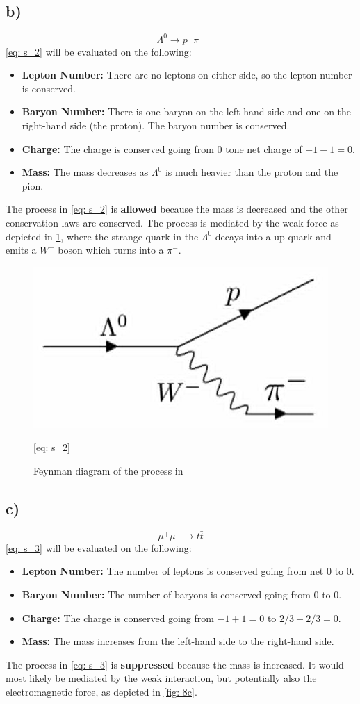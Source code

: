 \documentclass{article}
\begin{document}
\subsection*{b)}
\begin{equation}\label{eq: s_2}
Λ^{0} → p^{+} π^{-}
\end{equation}
\cref{eq: s_2} will be evaluated on the following:
\begin{itemize}
    \item \textbf{Lepton Number:} There are no leptons on either side, so the lepton number is conserved.
    \item \textbf{Baryon Number:} There is one baryon on the left-hand side and one on the right-hand side (the proton). The baryon number is conserved.
    \item \textbf{Charge:} The charge is conserved going from 0 tone net charge of $+1 -1 = 0$.
    \item \textbf{Mass:} The mass decreases as $Λ^{0}$ is much heavier than the proton and the pion.
\end{itemize}
The process in \cref{eq: s_2} is \textbf{allowed} because the mass is decreased and the other conservation laws are conserved. The process is mediated by the weak force as depicted in \cref{fig: 8b}, where the strange quark in the $Λ^{0}$ decays into a up quark and emits a $W^{-}$ boson which turns into a $π^{-}$. 
 
\begin{figure}[ht!]
\centering
\includegraphics[width = .45\textwidth]{8b.jpeg}
\caption{Feynman diagram of the process in} \cref{eq: s_2}
\label{fig: 8b}
\end{figure}

\subsection*{c)}
\begin{equation}\label{eq: s_3}
μ^{+}μ^{-} →  t\bar{t} 
\end{equation}
\cref{eq: s_3} will be evaluated on the following:
\begin{itemize}
    \item \textbf{Lepton Number:} The number of leptons is conserved going from net 0 to 0.
    \item \textbf{Baryon Number:} The number of baryons is conserved going from 0 to 0.
    \item \textbf{Charge:} The charge is conserved going from $-1 + 1 = 0$ to $2 / 3 - 2 / 3 = 0$.
    \item \textbf{Mass:} The mass increases from the left-hand side to the right-hand side.
\end{itemize}
The process in \cref{eq: s_3} is \textbf{suppressed} because the mass is increased. It would most likely be mediated by the weak interaction, but potentially also the electromagnetic force, as depicted in \cref{fig: 8c}.
\end{document}

